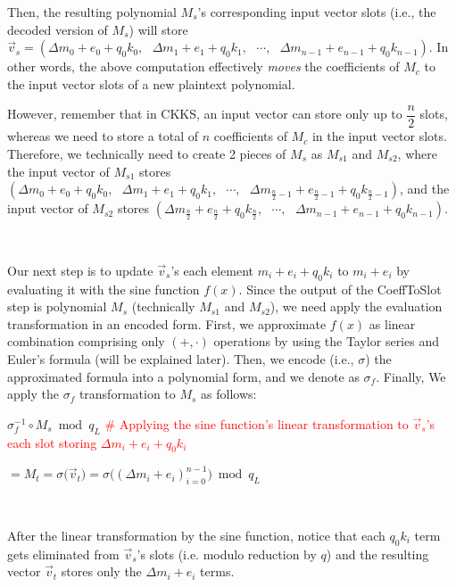 Then, the resulting polynomial $M_s$'s corresponding input vector slots (i.e., the decoded version of $M_s$) will store $\vec{v}_s = (\Delta m_0 + e_0 + q_0k_0, \text{ } \Delta m_1 + e_1 + q_0k_1, \text{ } \cdots, \text{ } \Delta m_{n-1} + e_{n-1} + q_0k_{n-1})$. In other words, the above computation effectively \textit{moves} the coefficients of $M_c$ to the input vector slots of a new plaintext polynomial. 

However, remember that in CKKS, an input vector can store only up to $\dfrac{n}{2}$ slots, whereas we need to store a total of $n$ coefficients of $M_c$ in the input vector slots. Therefore, we technically need to create 2 pieces of $M_s$ as $M_{s1}$ and $M_{s2}$, where the input vector of $M_{s1}$ stores $(\Delta m_0 + e_0 + q_0k_0, \text{ } \Delta m_1 + e_1 + q_0k_1, \text{ } \cdots, \text{ } \Delta m_{\frac{n}{2}-1} + e_{\frac{n}{2}-1} + q_0k_{\frac{n}{2}-1})$, and the input vector of $M_{s2}$ stores $(\Delta m_{\frac{n}{2}} + e_{\frac{n}{2}} + q_0k_{\frac{n}{2}}, \text{ } \cdots, \text{ } \Delta m_{n-1} + e_{n-1} + q_0k_{n-1})$.

$ $

Our next step is to update $\vec{v}_s$'s each element $m_i + e_i + q_0k_i$ to $m_i + e_i$ by evaluating it with the sine function $f(x)$. Since the output of the \textsf{CoeffToSlot} step is polynomial $M_s$ (technically $M_{s1}$ and $M_{s2}$), we need apply the evaluation transformation in an encoded form. First, we approximate $f(x)$ as linear combination comprising only $(+, \cdot)$ operations by using the Taylor series and Euler's formula (will be explained later). Then, we encode (i.e., $\sigma$) the approximated formula into a polynomial form, and we denote as $\sigma_f$. Finally, We apply the $\sigma_f$ transformation to $M_s$ as follows: 

$\sigma^{-1}_f \circ M_s \bmod q_L$  \textcolor{red}{ \# Applying the sine function's linear transformation to $\vec{v}_s$'s each slot storing $\Delta m_i + e_i + q_0k_i$}

$= M_t = \sigma\bm{(}\vec{v}_t\bm{)} = \sigma\bm{(}(\Delta m_i + e_i)_{i=0}^{n-1}\bm{)} \bmod q_L$

$ $

After the linear transformation by the sine function, notice that each $q_0 k_i$ term gets eliminated from $\vec{v}_s$'s slots (i.e. modulo reduction by $q$) and the resulting vector $\vec{v}_t$ stores only the $\Delta m_i + e_i$ terms. 



